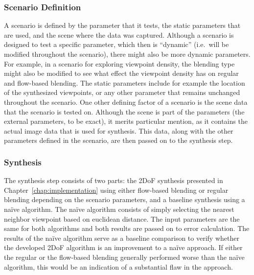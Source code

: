 \subsubsection{Scenario Definition}
A scenario is defined by the parameter that it tests, the static parameters that are used, and the scene where the data was captured. Although a scenario is designed to test a specific parameter, which then is ``dynamic'' (i.e.\ will be modified throughout the scenario), there might also be more dynamic parameters. For example, in a scenario for exploring viewpoint density, the blending type might also be modified to see what effect the viewpoint density has on regular and flow-based blending. The static parameters include for example the location of the synthesized viewpoints, or any other parameter that remains unchanged throughout the scenario. One other defining factor of a scenario is the scene data that the scenario is tested on. Although the scene is part of the parameters (the external parameters, to be exact), it merits particular mention, as it contains the actual image data that is used for synthesis. This data, along with the other parameters defined in the scenario, are then passed on to the synthesis step.



\subsubsection{Synthesis}
The synthesis step consists of two parts: the 2DoF synthesis presented in Chapter~\ref{chap:implementation} using either flow-based blending or regular blending depending on the scenario parameters, and a baseline synthesis using a na\"ive algorithm.
The na\"ive algorithm consists of simply selecting the nearest neighbor viewpoint based on euclidean distance. The input parameters are the same for both algorithms and both results are passed on to error calculation.
The results of the na\"ive algorithm serve as a baseline comparison to verify whether the developed 2DoF algorithm is an improvement to a na\"ive approach. If either the regular or the flow-based blending generally performed worse than the na\"ive algorithm, this would be an indication of a substantial flaw in the approach.

